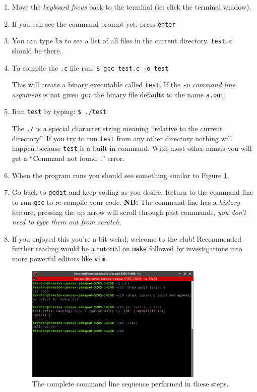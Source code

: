 \documentclass{lab}
\begin{document}
\begin{enumerate}
\item Move the \textit{keyboard focus} back to the terminal (ie: click the terminal window).

\item If you can see the command prompt yet, press \texttt{enter}

\item You can type \texttt{ls} to see a list of all files in the current directory. \texttt{test.c} should be there.

\item To compile the \texttt{.c} file run: \texttt{\$ gcc test.c -o test}

This will create a binary executable called \texttt{test}. If the \texttt{-o} \textit{command line argument} is not given \texttt{gcc} the binary file defaults to the name \texttt{a.out}.

\item Run \texttt{test} by typing: \texttt{\$ ./test}

The \texttt{./} is a special character string meaning ``relative to the current directory''. If you try to run \texttt{test} from any other directory nothing will happen because \texttt{test} is a built-in command. With most other names you will get a ``Command not found...'' error.

\item When the program runs you should see something similar to Figure \ref{fig:c_ubuntu}.

\item Go back to \texttt{gedit} and keep coding as you desire. Return to the command line to run \texttt{gcc} to re-compile your code. \textbf{NB:} The command line has a \textit{history} feature, pressing the up arrow will scroll through past commands, \textit{you don't need to type them out from scratch}.

\item If you enjoyed this you're a bit weird, welcome to the club! Recommended further reading would be a tutorial on \texttt{make} followed by investigations into more powerful editors like \texttt{vim}.

\begin{figure}[H]
\begin{center}
\includegraphics[width=0.8\textwidth]{c_ubuntu.png}
\end{center}
\caption{The complete command line sequence performed in these steps.}\label{fig:c_ubuntu}
\end{figure}


\end{enumerate}
\end{document}
